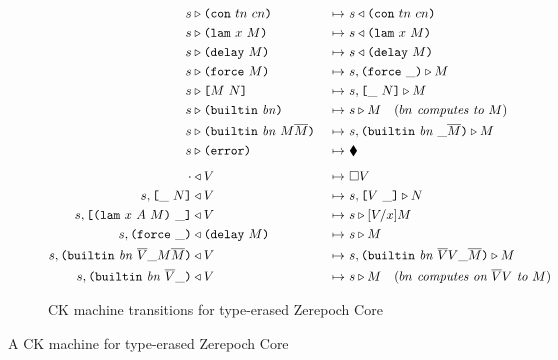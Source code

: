 \documentclass[../zerepoch-core-specification.tex]{subfiles}
\begin{document}
\begin{figure}[H]
\ContinuedFloat
  \begin{subfigure}[c]{\linewidth}

    \begin{minipage}{\linewidth}
\begin{alignat*}{2}
  s & \compute \con{tn}{cn}                      &~\mapsto~& s \return \con{tn}{cn}\\
  s & \compute \lamU{x}{M}                       &~\mapsto~& s \return \lamU{x}{M}\\
  s & \compute \delay{M}                         &~\mapsto~& s \return \delay{M}\\
  s & \compute \force{M}                         &~\mapsto~& s,\inForceFrame{} \compute M \\
  s & \compute \appU{M}{N}                       &~\mapsto~& s,\inAppLeftFrame{N} \compute M\\
  s & \compute \builtinU{bn}{\!\!}               &~\mapsto~& s \compute M
                                                 \quad (\textit{$bn$ computes to $M$}) \\
  s & \compute \builtinU{bn}{M \repetition{M}}   &~\mapsto~& s,\inBuiltinU{bn}{}{\_}{\repetition{M}} \compute M\\
  s & \compute \errorU                           &~\mapsto~& \ckerror{}\\
  \\[-10pt] %
  \cdot & \return V                              &~\mapsto~& \square V\\
  s,\inAppLeftFrame{N} & \return V               &~\mapsto~& s,\inAppRightFrame{V} \compute N\\
  s,\inAppRightFrame{\lam{x}{A}{M}} & \return V  &~\mapsto~& s \compute \subst{V}{x}{M}\\
  s,\inForceFrame{} & \return \delay{M}          &~\mapsto~& s \compute M\\
  s,\inBuiltinU{bn}{\repetition{V}}{\_}{M \repetition{M}} & \return V
                                                 &~\mapsto~& s,\inBuiltinU{bn}{\repetition{V} V}{\_}{\repetition{M}}
                                                 \compute M\\
  s,\inBuiltinU{bn}{\repetition{V}}{\_}{} & \return V
                                                 &~\mapsto~&  s \compute M
                                                 \quad (\textit{$bn$ computes on $\repetition{V}V$ to $M$})\\
    \end{alignat*}
\end{minipage}
    \caption{CK machine transitions for type-erased Zerepoch Core}
    \label{fig:untyped-ck-transitions}
\end{subfigure}
\caption{A CK machine for type-erased Zerepoch Core}
\label{fig:untyped-ck-machine}
\end{figure}
\end{document}
